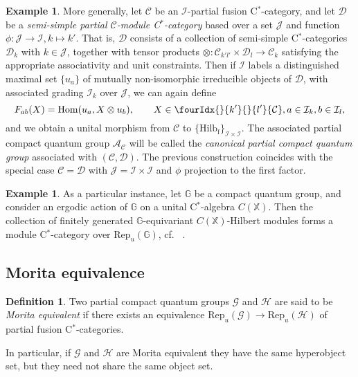 \documentclass[10pt]{article}
\DeclareMathOperator{\fin}{\mathrm{f}}
\DeclareMathOperator{\Hom}{Hom}
\newcommand{\G}{\mathbb{G}}
\newcommand{\CatC}{\mathcal{C}}
\newcommand{\CatD}{\mathcal{D}}
\newcommand{\CatCC}{\mathscr{C}}
\newcommand{\CatDD}{\mathscr{D}}
\newcommand{\Hilb}{\mathrm{Hilb}}
\newcommand{\Rep}{\mathrm{Rep}}
\newcommand{\Gr}[5]{\fourIdx{#2}{#4}{#3}{#5}{#1}}%
\newcommand{\Gru}[3]{\Gr{#1}{}{}{#2}{#3}}
\theoremstyle{definition}
\newtheorem{Def}[Theorem]{Definition}
\newtheorem{Exa}[Theorem]{Example}
\numberwithin{equation}{section}
\begin{document}
\begin{Exa} More generally, let $\CatCC$ be an $\mathscr{I}$-partial fusion C$^*$-category, and let $\CatDD$ be a \emph{semi-simple partial $\CatCC$-module C$^*$-category} based over a set $\mathscr{J}$ and function $\phi:\mathscr{J}\rightarrow \mathscr{I},k\mapsto k'$. That is, $\CatDD$ consists of a collection of semi-simple C$^*$-categories $\CatD_{k}$ with $k\in \mathscr{J}$, together with tensor products $\otimes: \CatC_{k'l'}\times \CatD_{l}\rightarrow \CatC_{k}$ satisfying the appropriate associativity and unit constraints. Then if $\mathcal{I}$ labels a distinguished maximal set $\{u_a\}$ of mutually non-isomorphic irreducible objects of $\CatD$, with associated grading $\mathcal{I}_{k}$ over $\mathscr{J}$, we can again define \[F_{ab}(X)  = \Hom(u_a,  X\otimes u_b),\qquad X\in \Gru{\CatC}{k'}{l'}, a\in \mathcal{I}_{k},b\in\mathcal{I}_{l},\] and we obtain a unital morphism from $\CatCC$ to $\{\Hilb_{\fin}\}_{\mathcal{I}\times \mathcal{I}}$. The associated partial compact quantum group $\mathscr{A}_{\CatCC}$ will be called the \emph{canonical partial compact quantum group} associated with $(\CatCC,\CatDD)$. The previous construction coincides with the special case $\CatCC= \CatDD$ with $\mathscr{J} = \mathscr{I}\times \mathscr{I}$ and $\phi$ projection to the first factor.
\end{Exa}

\begin{Exa}\label{ExaErgo} As a particular instance, let $\G$ be a compact quantum group, and consider an ergodic action of $\G$ on a unital C$^*$-algebra $C(\mathbb{X})$. Then the collection of finitely generated $\G$-equivariant $C(\mathbb{X})$-Hilbert modules forms a module C$^*$-category over $\Rep_u(\G)$, cf.~ \cite{DCY1}. 
\end{Exa}

\subsection{Morita equivalence}


\begin{Def} Two partial compact quantum groups $\mathscr{G}$ and $\mathscr{H}$ are said to be \emph{Morita equivalent} if there exists an equivalence $\Rep_u(\mathscr{G}) \rightarrow \Rep_u(\mathscr{H})$ of partial fusion C$^*$-categories. 
\end{Def} 

In particular, if $\mathscr{G}$ and $\mathscr{H}$ are Morita equivalent they have the same hyperobject set, but they need not share the same object set.
\end{document}

